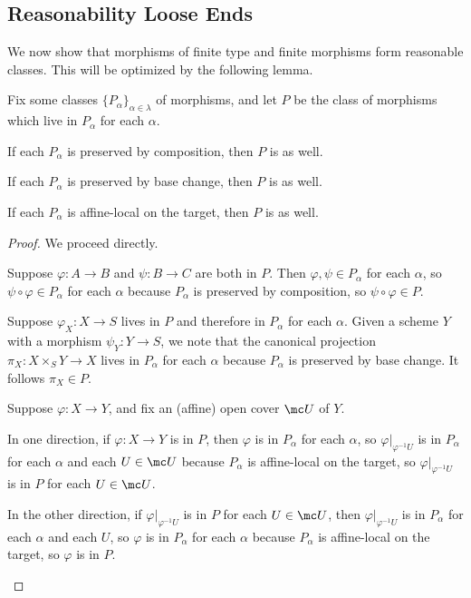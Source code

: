 \documentclass[../notes.tex]{subfiles}
\begin{document}
\subsection{Reasonability Loose Ends}
We now show that morphisms of finite type and finite morphisms form reasonable classes. This will be optimized by the following lemma.
\begin{lemma} \label{lem:class-intersection-is-reasonable}
	Fix some classes $\{P_\alpha\}_{\alpha\in\lambda}$ of morphisms, and let $P$ be the class of morphisms which live in $P_\alpha$ for each $\alpha$.
	\begin{listalph}
		\item If each $P_\alpha$ is preserved by composition, then $P$ is as well.
		\item If each $P_\alpha$ is preserved by base change, then $P$ is as well.
		\item If each $P_\alpha$ is affine-local on the target, then $P$ is as well.
	\end{listalph}
\end{lemma}
\begin{proof}
	We proceed directly.
	\begin{listalph}
		\item Suppose $\varphi\colon A\to B$ and $\psi\colon B\to C$ are both in $P$. Then $\varphi,\psi\in P_\alpha$ for each $\alpha$, so $\psi\circ\varphi\in P_\alpha$ for each $\alpha$ because $P_\alpha$ is preserved by composition, so $\psi\circ\varphi\in P$.
		\item Suppose $\varphi_X\colon X\to S$ lives in $P$ and therefore in $P_\alpha$ for each $\alpha$. Given a scheme $Y$ with a morphism $\psi_Y\colon Y\to S$, we note that the canonical projection $\pi_X\colon X\times_SY\to X$ lives in $P_\alpha$ for each $\alpha$ because $P_\alpha$ is preserved by base change. It follows $\pi_X\in P$.
		\item Suppose $\varphi\colon X\to Y$, and fix an (affine) open cover $\mc U$ of $Y$.

		In one direction, if $\varphi\colon X\to Y$ is in $P$, then $\varphi$ is in $P_\alpha$ for each $\alpha$, so $\varphi|_{\varphi^{-1}U}$ is in $P_\alpha$ for each $\alpha$ and each $U\in\mc U$ because $P_\alpha$ is affine-local on the target, so $\varphi|_{\varphi^{-1}U}$ is in $P$ for each $U\in\mc U$.

		In the other direction, if $\varphi|_{\varphi^{-1}U}$ is in $P$ for each $U\in\mc U$, then $\varphi|_{\varphi^{-1}U}$ is in $P_\alpha$ for each $\alpha$ and each $U$, so $\varphi$ is in $P_\alpha$ for each $\alpha$ because $P_\alpha$ is affine-local on the target, so $\varphi$ is in $P$.
		\qedhere
	\end{listalph}
\end{proof}
\end{document}
